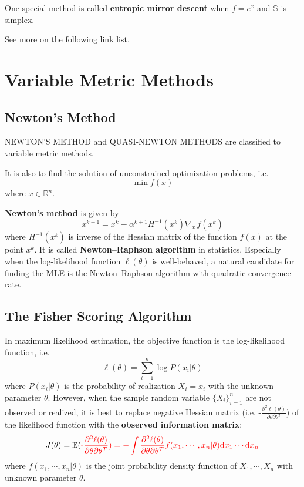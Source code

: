 \documentclass[titlestyle=hang,11pt]{elegantbook}
\begin{document}
One special method is called \textbf{entropic mirror descent} when $f=e^x$ and $\mathbb{S}$ is simplex.

See more on the following link list.


\section{Variable Metric Methods}

\subsection{Newton's Method}

NEWTON’S METHOD and QUASI-NEWTON METHODS are classified to variable metric methods.

It is also to find the solution of unconstrained optimization problems, i.e.
$$\min f(x)$$
where $x\in \mathbb{R}^{n}$.

\textbf{Newton's method} is given by
$$
x^{k+1}=x^{k}-\alpha^{k+1}H^{-1}(x^{k})\nabla_{x}\,{f(x^{k})}
$$
where $H^{-1}(x^{k})$ is inverse of the Hessian matrix of the function $f(x)$ at the point $x^{k}$.
It is called \textbf{Newton–Raphson algorithm} in statistics.
Especially when the log-likelihood function $\ell(\theta)$ is well-behaved,
a natural candidate for finding the MLE is the Newton–Raphson algorithm with quadratic convergence rate.


\subsection{The Fisher Scoring Algorithm}

In maximum likelihood estimation, the objective function is the log-likelihood function, i.e.
$$
\ell(\theta)=\sum_{i=1}^{n}\log{P(x_i|\theta)}
$$
where $P(x_i|\theta)$ is the probability of realization $X_i=x_i$ with the unknown parameter $\theta$.
However, when the sample random variable $\{X_i\}_{i=1}^{n}$ are not observed or realized, it is best to
replace negative Hessian matrix (i.e. -$\frac{\partial^2\ell(\theta)}{\partial\theta\partial\theta^{T}}$) of the likelihood function with the
\textbf{observed information matrix}:
$$
J(\theta)=\mathbb{E}(\color{red}{\text{-}}\frac{\partial^2\ell(\theta)}{\partial\theta\partial\theta^{T}})=\color{red}{-}\int\frac{\partial^2\ell(\theta)}{\partial\theta\partial\theta^{T}}f(x_1, \cdots, x_n|\theta)\mathrm{d}x_1\cdots\mathrm{d}x_n
$$
where $f(x_1, \cdots, x_n|\theta)$ is the joint probability density function of  $X_1, \cdots, X_n$ with unknown parameter $\theta$.
\end{document}
